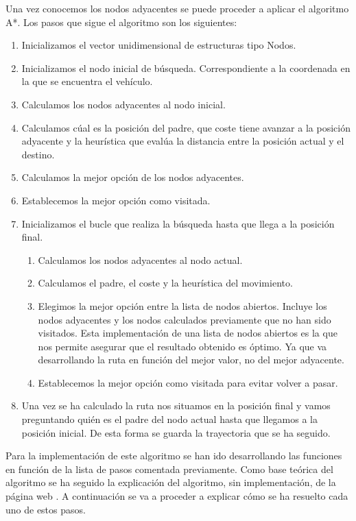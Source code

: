 Una vez conocemos los nodos adyacentes se puede proceder a aplicar el algoritmo A*. Los pasos que sigue el algoritmo son los siguientes:

\begin{enumerate}
\item Inicializamos el vector unidimensional de estructuras tipo Nodos.
\item Inicializamos el nodo inicial de búsqueda. Correspondiente a la coordenada en la que se encuentra el vehículo.
\item Calculamos los nodos adyacentes al nodo inicial.
\item Calculamos cúal es la posición del padre, que coste tiene avanzar a la posición adyacente y la heurística que evalúa la distancia entre la posición actual y el destino.
\item Calculamos la mejor opción de los nodos adyacentes.
\item Establecemos la mejor opción como visitada.
\item Inicializamos el bucle que realiza la búsqueda hasta que llega a la posición final.
\begin{enumerate}
\item Calculamos los nodos adyacentes al nodo actual.
\item Calculamos el padre, el coste y la heurística del movimiento.
\item Elegimos la mejor opción entre la lista de nodos abiertos. Incluye los nodos adyacentes y los nodos calculados previamente que no han sido visitados. Esta implementación de una lista de nodos abiertos es la que nos permite asegurar que el resultado obtenido es óptimo. Ya que va desarrollando la ruta en función del mejor valor, no del mejor adyacente.
\item Establecemos la mejor opción como visitada para evitar volver a pasar.
\end{enumerate} 
\item Una vez se ha calculado la ruta nos situamos en la posición final y vamos preguntando quién es el padre del nodo actual hasta que llegamos a la posición inicial. De esta forma se guarda la trayectoria que se ha seguido.
\end{enumerate}

Para la implementación de este algoritmo se han ido desarrollando las funciones en función de la lista de pasos comentada previamente. Como base teórica del algoritmo se ha seguido la explicación del algoritmo, sin implementación, de la página web \cite{APrincipiantes}. A continuación se va a proceder a explicar cómo se ha resuelto cada uno de estos pasos.


